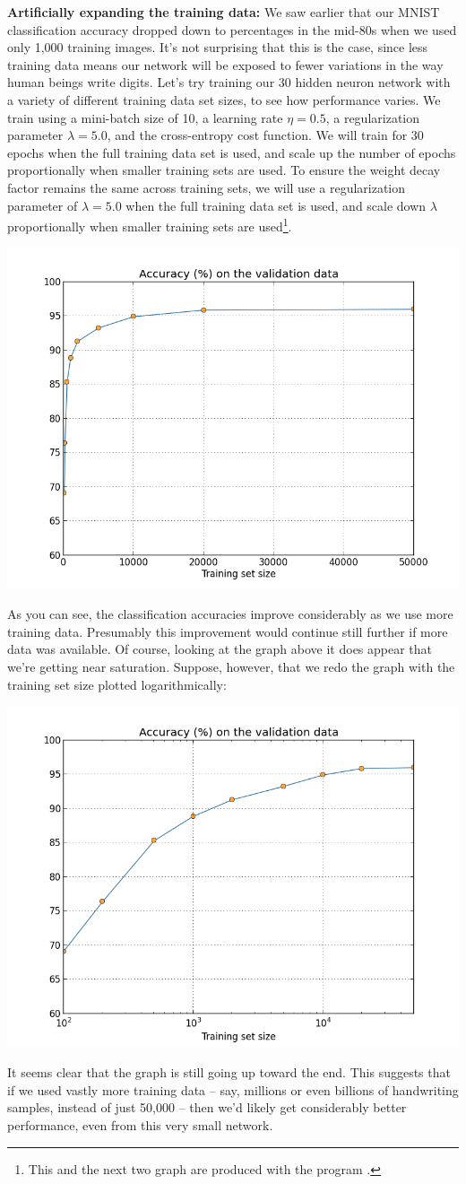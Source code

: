 \documentclass[a4paper,twoside,10pt]{book}
\begin{document}
\textbf{Artificially expanding the training data:} We saw earlier that our MNIST classification accuracy dropped down to percentages in the mid-80s when we used only 1,000 training images. It's not surprising that this is the case, since less training data means our network will be exposed to fewer variations in the way human beings write digits. Let's try training our 30 hidden neuron network with a variety of different training data set sizes, to see how performance varies. We train using a mini-batch size of 10, a learning rate $\eta=0.5$, a regularization parameter $\lambda=5.0$, and the cross-entropy cost function. We will train for 30 epochs when the full training data set is used, and scale up the number of epochs proportionally when smaller training sets are used. To ensure the weight decay factor remains the same across training sets, we will use a regularization parameter of $\lambda=5.0$ when the full training data set is used, and scale down $\lambda$ proportionally when smaller training sets are used\footnote{This and the next two graph are produced with the program .}.
\begin{center}
	\includegraphics[width=0.6\linewidth]{figures/ch3/more_data}
\end{center}
As you can see, the classification accuracies improve considerably as we use more training data. Presumably this improvement would continue still further if more data was available. Of course, looking at the graph above it does appear that we're getting near saturation. Suppose, however, that we redo the graph with the training set size plotted logarithmically:
\begin{center}
	\includegraphics[width=0.6\linewidth]{figures/ch3/more_data_log}
\end{center}
It seems clear that the graph is still going up toward the end. This suggests that if we used vastly more training data -- say, millions or even billions of handwriting samples, instead of just 50,000 -- then we'd likely get considerably better performance, even from this very small network.
\end{document}
